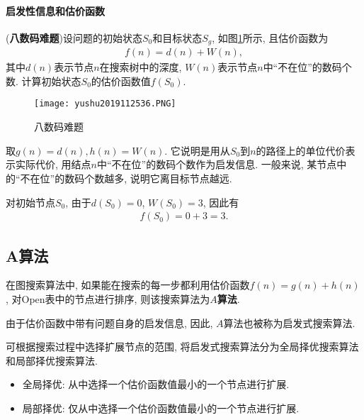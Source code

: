 \paragraph{启发性信息和估价函数}
\begin{example}\label{AI32C4exam08}
    (\textbf{八数码难题})设问题的初始状态$S_0$和目标状态$S_g$, 如图\ref{AI32fig2019120134}所示, 且估价函数为
\begin{align}
    f(n)=d(n)+W(n),
\end{align}
其中$d(n)$表示节点$n$在搜索树中的深度, $W(n)$表示节点$n$中“不在位”的数码个数. 计算初始状态$S_0$的估价函数值$f(S_0)$.
\end{example}
\begin{figure}[H]
    \centering
    \texttt{[image: yushu2019112536.PNG]}
    \caption{八数码难题}
    \label{AI32fig2019120134}
\end{figure}
\begin{result}
取$g(n)=d(n), h(n)=W(n)$. 它说明是用从$S_0$到$n$的路径上的单位代价表示实际代价, 用结点$n$中“不在位”的数码个数作为启发信息.
一般来说, 某节点中的“不在位”的数码个数越多, 说明它离目标节点越远.

\begin{example}
    对初始节点$S_0$, 由于$d(S_0)=0$, $W(S_0)=3$, 因此有
\begin{align}
    f(S_0)=0+3=3.
\end{align}
\end{example}
\end{result}
\subsection{A算法}
在图搜索算法中, 如果能在搜索的每一步都利用估价函数$f(n)=g(n)+h(n)$, 对Open表中的节点进行排序, 则该搜索算法为\textbf{$A$算法}.
\begin{remark}
    由于估价函数中带有问题自身的启发信息, 因此, $A$算法也被称为启发式搜索算法.
\end{remark}
\begin{remark}
    可根据搜索过程中选择扩展节点的范围, 将启发式搜索算法分为全局择优搜索算法和局部择优搜索算法.
\end{remark}

\begin{itemize}
	\item \textcolor[rgb]{0,0,1}{全局择优}: 从中选择一个估价函数值最小的一个节点进行扩展.
	\item \textcolor[rgb]{0,0,1}{局部择优}: 仅从中选择一个估价函数值最小的一个节点进行扩展.
\end{itemize}
